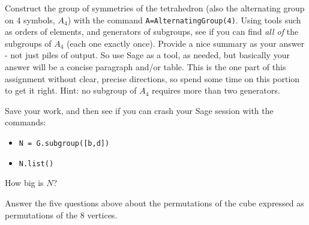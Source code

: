 \begin{sageverbatim}\end{sageverbatim}
%
Construct the group of symmetries of the tetrahedron (also the alternating group on 4 symbols, $A_4$) with the command \verb?A=AlternatingGroup(4)?.  Using tools such as orders of elements, and generators of subgroups, see if you can find \emph{all of} the subgroups of $A_4$ (each one exactly once).  Provide a nice summary as your answer - not just piles of output.  So use Sage as a tool, as needed, but basically your answer will be a concise paragraph and/or table.  This is the one part of this assignment without clear, precise directions, so spend some time on this portion to get it right.  Hint: no subgroup of $A_4$ requires more than two generators.
\begin{sageverbatim}\end{sageverbatim}
%
Save your work, and then see if you can crash your Sage session with the commands:
%
\begin{itemize}
\item\verb?N = G.subgroup([b,d])?
\item\verb?N.list()?
\end{itemize}
%
How big is $N$?
\begin{sageverbatim}\end{sageverbatim}
%
Answer the five questions above about the permutations of the cube expressed as permutations of the 8 vertices.
\begin{sageverbatim}\end{sageverbatim}
%
